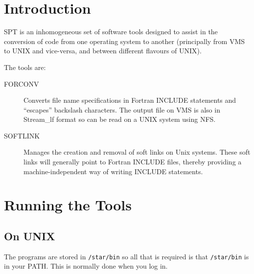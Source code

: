 \stardocabstract
 \newpage
 \begin{latexonly}
   \setlength{\parskip}{0mm}
   \latexonlytoc
   \setlength{\parskip}{\medskipamount}
   \markright{\stardocname}
 \end{latexonly}
\newpage
\renewcommand{\thepage}{\arabic{page}}
\setcounter{page}{1}

\section{Introduction}

SPT is an inhomogeneous set of 
software tools designed to assist in the
conversion of code from one operating system to another (principally from 
VMS to UNIX and vice-versa, and between different flavours of UNIX).

The tools are:
\begin{description} 
\item[FORCONV] Converts file name specifications in Fortran INCLUDE statements
and ``escapes'' backslash characters. The output file on VMS is also in
Stream\_lf format so can be read on a UNIX system using NFS.
\item[SOFTLINK] Manages the creation and removal of soft links on Unix systems.
These soft links will generally point to Fortran INCLUDE files, thereby
providing a machine-independent way of writing INCLUDE statements.
\end{description}

\section{Running the Tools}

\subsection{On UNIX}

The programs are stored in {\tt /star/bin} so all that is required is
that {\tt /star/bin} is in your PATH. This is normally done when you log in.
